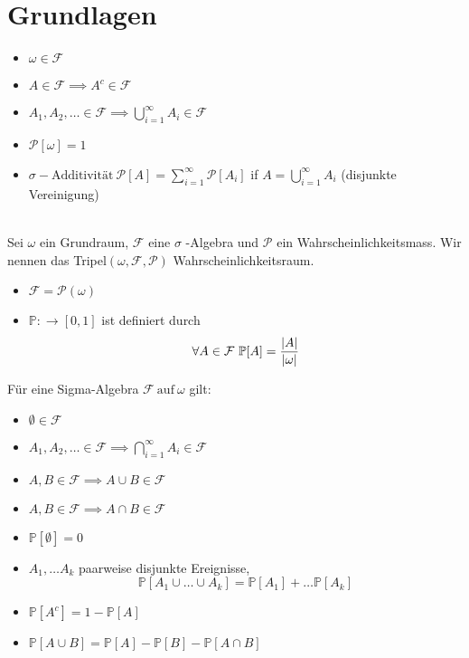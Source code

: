 \section*{Grundlagen}
\begin{itemize}
    \item \(\omega \in \mathcal{F}\)
    \item  \(A \in \mathcal{F} \implies A^c \in \mathcal{F}\)
    \item \(A_1, A_2, \dots \in \mathcal{F} \implies \bigcup_{i=1}^{\infty} A_i \in \mathcal{F} \)
\end{itemize}
\Def[1.2 Wahrscheinlichkeitsmass ]
\begin{itemize}
    \item \( \mathcal{P}[\omega] = 1\)
    \item \(\sigma-\text{Additivität} \ \mathcal{P}[A] = \sum_{i=1}^{\infty} \mathcal{P}[A_i]\) \newline if \( A = \bigcup_{i=1}^{\infty} A_i \) (disjunkte Vereinigung)
\end{itemize}
\Def[1.3 Wahrscheinlichkeitsraum ] \\
Sei \( \omega \) ein Grundraum, \(\mathcal{F}\) eine \(\sigma\) -Algebra und \(\mathcal{P}\) ein Wahrscheinlichkeitsmass. Wir nennen das Tripel\( (\omega, \mathcal{F}, \mathcal{P})\)  Wahrscheinlichkeitsraum.
 \\
\begin{itemize}
    \item \(\mathcal{F} = \mathcal{P}(\omega)\)
    \item \(\mathbb{P} : \rightarrow \left[0,1\right]\) ist definiert durch \[ \forall A \in \mathcal{F} \ \mathbb{P}[A] = \frac{\left\lvert A \right\rvert}{\left\lvert \omega \right\rvert}\]
\end{itemize}
\Satz[1.6]
Für eine Sigma-Algebra \(\mathcal{F} \ \text{auf} \ \omega\) gilt:
\begin{itemize}
    \item \(\emptyset \in \mathcal{F}\)
    \item \(A_1, A_2, \dots \in \mathcal{F} \implies \bigcap_{i=1}^{\infty} A_i \in \mathcal{F}\)
    \item \(A,B \in \mathcal{F} \implies A \cup B \in \mathcal{F}\)
    \item \(A,B \in \mathcal{F} \implies A \cap B \in \mathcal{F}\)
\end{itemize}
\Satz[1.7]
\begin{itemize}
    \item \( \mathbb{P}[\emptyset] = 0\)
    \item \(A_1, \dots A_k\) paarweise disjunkte Ereignisse, \[\mathbb{P}[A_1 \cup \dots \cup A_k] = \mathbb{P}[A_1] + \dots \mathbb{P}[A_k]\]
    \item \( \mathbb{P}[A^c] = 1 - \mathbb{P}[A]\)
    \item \(\mathbb{P}[A \cup B ] = \mathbb{P}[A] - \mathbb{P}[B] - \mathbb{P}[A \cap B]\)
\end{itemize}
